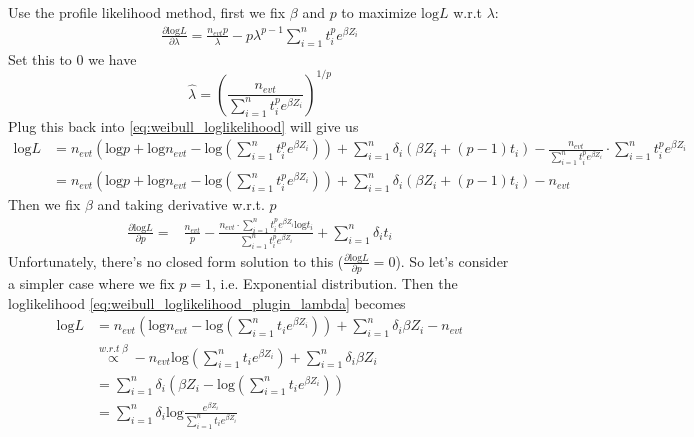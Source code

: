 \documentclass[a4paper,12pt]{article}
\begin{document}
Use the profile likelihood method, first we fix $\beta$ and $p$ to maximize $\mathrm{log}L$ w.r.t $\lambda$:
\[
  \begin{aligned}
    \frac{\partial\mathrm{log}L}{\partial \lambda}
    = \frac{n_{evt}p}{\lambda}
    - p\lambda^{p - 1}\sum\limits_{i = 1}^nt_i^pe^{\beta Z_i}
  \end{aligned}
\]
Set this to 0 we have
\[
  \hat{\lambda} = \left(
    \frac{n_{evt}}{\sum\limits_{i = 1}^nt_i^pe^{\beta Z_i}}
  \right)^{1 / p}
\]
Plug this back into \eqref{eq:weibull_loglikelihood} will give us
\begin{equation}
  \label{eq:weibull_loglikelihood_plugin_lambda}
  \begin{aligned}
    \mathrm{log}L
    &= n_{evt}\left(
      \mathrm{log}p + \mathrm{log}n_{evt}
      - \mathrm{log}\left(\sum\limits_{i = 1}^nt_i^pe^{\beta Z_i}\right)
      \right)
      + \sum\limits_{i = 1}^n\delta_i\left(\beta Z_i + \left(p - 1\right)t_i\right)
      - \frac{n_{evt}}{\sum\limits_{i = 1}^nt_i^pe^{\beta Z_i}} \cdot \sum\limits_{i = 1}^nt_i^pe^{\beta Z_i}    \\
    &= n_{evt}\left(
      \mathrm{log}p + \mathrm{log}n_{evt}
      - \mathrm{log}\left(\sum\limits_{i = 1}^nt_i^pe^{\beta Z_i}\right)
      \right)
      + \sum\limits_{i = 1}^n\delta_i\left(\beta Z_i + \left(p - 1\right)t_i\right)
      - n_{evt}
  \end{aligned} 
\end{equation}
Then we fix $\beta$ and taking derivative w.r.t. $p$
\[
  \begin{aligned}
    \frac{\partial\mathrm{log}L}{\partial p}
    =&
       \frac{n_{evt}}{p}
       - \frac{
       n_{evt} \cdot
       \sum\limits_{i = 1}^nt_i^pe^{\beta Z_i}\mathrm{log}t_i}{
       \sum\limits_{i = 1}^nt_i^pe^{\beta Z_i}
       }
       + \sum\limits_{i = 1}^{n}\delta_it_i
  \end{aligned}
\]
Unfortunately, there's no closed form solution to this ($\frac{\partial\mathrm{log}L}{\partial p} = 0$). So let's consider a simpler case where we fix $p = 1$, i.e. Exponential distribution. Then the loglikelihood \eqref{eq:weibull_loglikelihood_plugin_lambda} becomes
\[
  \begin{aligned}
    \mathrm{log}L
    &= n_{evt}\left(
      \mathrm{log}n_{evt}
      - \mathrm{log}\left(\sum\limits_{i = 1}^nt_ie^{\beta Z_i}\right)
      \right)
      + \sum\limits_{i = 1}^n\delta_i\beta Z_i
      - n_{evt}    \\
    &\overset{w.r.t\; \beta}{\propto}
      -n_{evt}\mathrm{log}\left(\sum\limits_{i = 1}^nt_ie^{\beta Z_i}\right)
      +  \sum\limits_{i = 1}^n\delta_i\beta Z_i    \\
    &= \sum\limits_{i = 1}^n\delta_i\left(
      \beta Z_i - \mathrm{log}\left(\sum\limits_{i = 1}^nt_ie^{\beta Z_i}\right)
      \right)    \\
    &= \sum\limits_{i = 1}^n\delta_i\mathrm{log}
      \frac{e^{\beta Z_i}}{\sum\limits_{i = 1}^nt_ie^{\beta Z_i}}
  \end{aligned}
\]
\end{document}
